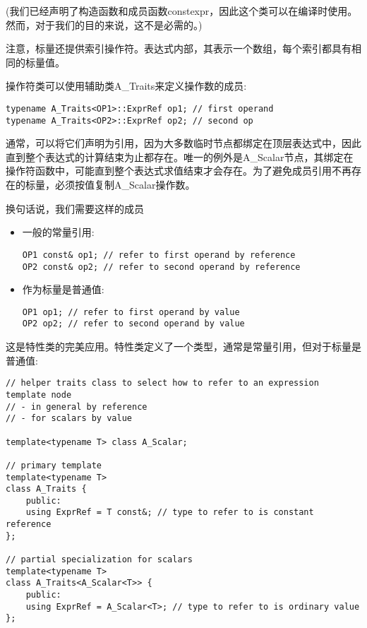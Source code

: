 (我们已经声明了构造函数和成员函数constexpr，因此这个类可以在编译时使用。然而，对于我们的目的来说，这不是必需的。)

注意，标量还提供索引操作符。表达式内部，其表示一个数组，每个索引都具有相同的标量值。

操作符类可以使用辅助类A\_Traits来定义操作数的成员:

\begin{lstlisting}[style=styleCXX]
typename A_Traits<OP1>::ExprRef op1; // first operand
typename A_Traits<OP2>::ExprRef op2; // second op
\end{lstlisting}

通常，可以将它们声明为引用，因为大多数临时节点都绑定在顶层表达式中，因此直到整个表达式的计算结束为止都存在。唯一的例外是A\_Scalar节点，其绑定在操作符函数中，可能直到整个表达式求值结束才会存在。为了避免成员引用不再存在的标量，必须按值复制A\_Scalar操作数。

换句话说，我们需要这样的成员

\begin{itemize}
\item 
一般的常量引用:
\begin{lstlisting}[style=styleCXX]
OP1 const& op1; // refer to first operand by reference
OP2 const& op2; // refer to second operand by reference
\end{lstlisting}

\item 
作为标量是普通值:
\begin{lstlisting}[style=styleCXX]
OP1 op1; // refer to first operand by value
OP2 op2; // refer to second operand by value
\end{lstlisting}
\end{itemize}

这是特性类的完美应用。特性类定义了一个类型，通常是常量引用，但对于标量是普通值:

\begin{lstlisting}[style=styleCXX]
// helper traits class to select how to refer to an expression template node
// - in general by reference
// - for scalars by value

template<typename T> class A_Scalar;

// primary template
template<typename T>
class A_Traits {
	public:
	using ExprRef = T const&; // type to refer to is constant reference
};

// partial specialization for scalars
template<typename T>
class A_Traits<A_Scalar<T>> {
	public:
	using ExprRef = A_Scalar<T>; // type to refer to is ordinary value
};
\end{lstlisting}

